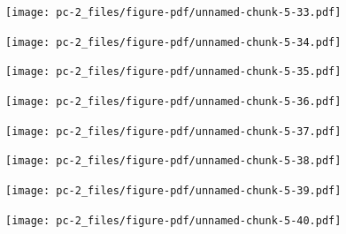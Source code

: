\documentclass[
  letterpaper,
  DIV=11,
  numbers=noendperiod]{scrreprt}
\begin{document}
\begin{figure}[H]

{\centering \texttt{[image: pc-2\_files/figure-pdf/unnamed-chunk-5-33.pdf]}

}

\end{figure}

\begin{figure}[H]

{\centering \texttt{[image: pc-2\_files/figure-pdf/unnamed-chunk-5-34.pdf]}

}

\end{figure}

\begin{figure}[H]

{\centering \texttt{[image: pc-2\_files/figure-pdf/unnamed-chunk-5-35.pdf]}

}

\end{figure}

\begin{figure}[H]

{\centering \texttt{[image: pc-2\_files/figure-pdf/unnamed-chunk-5-36.pdf]}

}

\end{figure}

\begin{figure}[H]

{\centering \texttt{[image: pc-2\_files/figure-pdf/unnamed-chunk-5-37.pdf]}

}

\end{figure}

\begin{figure}[H]

{\centering \texttt{[image: pc-2\_files/figure-pdf/unnamed-chunk-5-38.pdf]}

}

\end{figure}

\begin{figure}[H]

{\centering \texttt{[image: pc-2\_files/figure-pdf/unnamed-chunk-5-39.pdf]}

}

\end{figure}

\begin{figure}[H]

{\centering \texttt{[image: pc-2\_files/figure-pdf/unnamed-chunk-5-40.pdf]}

}

\end{figure}
\end{document}
